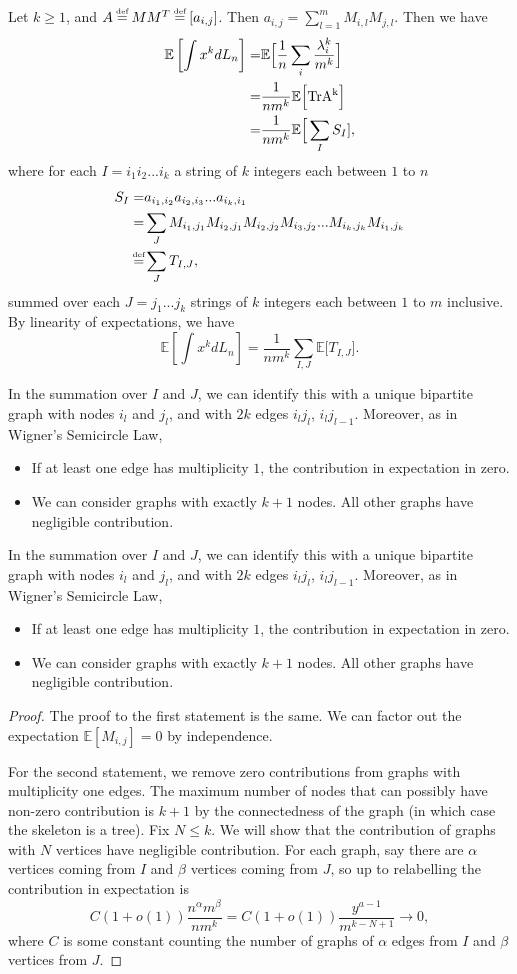 \documentclass[11pt,openany]{article}
\newcommand\defeq{\mathrel{\stackrel{\makebox[0pt]{\mbox{\normalfont\tiny def}}}{=}}}
\newcounter{thmcounter} %
\newcommand{\proposition}[1]{
	\addtocounter{thmcounter}{1}
	\begin{tcolorbox}[title=Proposition {\thesection}.{\arabic{thmcounter}},colframe=red!50!blue!20!white,colback=red!35!blue!10!white, coltitle=black]{#1}\end{tcolorbox}

}
\let\oldproposition\proposition
\renewcommand{\proposition}[2][\relax]{\ifx\relax#1\oldproposition{#2}\else \begin{aproposition}{}{#1} #2 \end{aproposition} \fi}
\begin{document}
Let $k\geq 1$, and $A\defeq MM^T\defeq[a_{i,j}]$.
Then $a_{i,j}=\sum_{l=1}^m M_{i,l}M_{j,l}$.
Then we have \begin{align*}
    \mathbb{E}\left[\int x^k dL_n\right]=&\mathbb{E}\Big[\frac{1}{n} \sum_{i}\frac{\lambda_i^k}{m^k}\Big]\\
    =& \frac{1}{nm^k}\mathbb{E}\Big[\rm{Tr}A^k\Big]\\
    =& \frac{1}{nm^k}\mathbb{E}\Big[\sum_{I}S_I],
\end{align*}
where for each $I=i_1i_2...i_k$ a string of $k$ integers each between $1$ to $n$ \begin{align*}  
S_I=& a_{i_1,i_2}a_{i_2,i_3}...a_{i_k,i_1}\\
=&\sum_{J} M_{i_1,j_1}M_{i_2,j_1}M_{i_2,j_2}M_{i_3,j_2}... M_{i_k,j_k}M_{i_1,j_k}\\
\defeq & \sum_J T_{I,J},
\end{align*}
summed over each $J=j_1...j_k$ strings of $k$ integers each between $1$ to $m$ inclusive. 
By linearity of expectations, we have \[
    \mathbb{E}\left[\int x^k dL_n\right]
    =\frac{1}{nm^k}\sum_{I,J}\mathbb{E}\Big[T_{I,J}\Big].
\]
\proposition{
    In the summation over $I$ and $J$, we can identify this with a unique bipartite graph with nodes $i_l$ and $j_l$, and with $2k$ edges $i_lj_l$, $i_lj_{l-1}$.
    Moreover, as in Wigner's Semicircle Law, \begin{itemize}
        \item If at least one edge has multiplicity $1$, the contribution in expectation in zero.
        \item We can consider graphs with exactly $k+1$ nodes. All other graphs have negligible contribution.
    \end{itemize}
}
\begin{proof}
    The proof to the first statement is the same. We can factor out the expectation $\mathbb{E}[M_{i,j}]=0$ by independence.

    For the second statement, we remove zero contributions from graphs with multiplicity one edges. The maximum number of nodes that can possibly have non-zero contribution is $k+1$ by the connectedness of the graph (in which case the skeleton is a tree). Fix $N\leq k$. We will show that the contribution of graphs with $N$ vertices have negligible contribution. For each graph, say there are $\alpha$ vertices coming from $I$ and $\beta$ vertices coming from $J$, so up to relabelling the contribution in expectation is \[
        C(1+o(1))\frac{n^\alpha m^\beta}{nm^k} = C(1+o(1))\frac{y^{a-1}}{m^{k-N+1}}\to 0,
    \]
    where $C$ is some constant counting the number of graphs of $\alpha$ edges from $I$ and $\beta$ vertices from $J$.
\end{proof}
\end{document}
